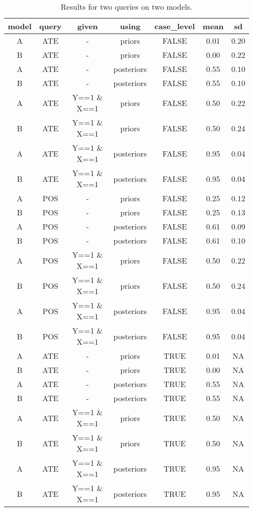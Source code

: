 \documentclass[
  11pt,
  article]{jss}
\begin{document}
\begin{longtable}[t]{ccccccc}

\caption{\label{tbl-batch-query}Results for two queries on two models.}

\tabularnewline

\toprule
model & query & given & using & case\_level & mean & sd\\
\midrule
A & ATE & - & priors & FALSE & 0.01 & 0.20\\
B & ATE & - & priors & FALSE & 0.00 & 0.22\\
A & ATE & - & posteriors & FALSE & 0.55 & 0.10\\
B & ATE & - & posteriors & FALSE & 0.55 & 0.10\\
A & ATE & Y==1 \& X==1 & priors & FALSE & 0.50 & 0.22\\
\addlinespace
B & ATE & Y==1 \& X==1 & priors & FALSE & 0.50 & 0.24\\
A & ATE & Y==1 \& X==1 & posteriors & FALSE & 0.95 & 0.04\\
B & ATE & Y==1 \& X==1 & posteriors & FALSE & 0.95 & 0.04\\
A & POS & - & priors & FALSE & 0.25 & 0.12\\
B & POS & - & priors & FALSE & 0.25 & 0.13\\
\addlinespace
A & POS & - & posteriors & FALSE & 0.61 & 0.09\\
B & POS & - & posteriors & FALSE & 0.61 & 0.10\\
A & POS & Y==1 \& X==1 & priors & FALSE & 0.50 & 0.22\\
B & POS & Y==1 \& X==1 & priors & FALSE & 0.50 & 0.24\\
A & POS & Y==1 \& X==1 & posteriors & FALSE & 0.95 & 0.04\\
\addlinespace
B & POS & Y==1 \& X==1 & posteriors & FALSE & 0.95 & 0.04\\
A & ATE & - & priors & TRUE & 0.01 & NA\\
B & ATE & - & priors & TRUE & 0.00 & NA\\
A & ATE & - & posteriors & TRUE & 0.55 & NA\\
B & ATE & - & posteriors & TRUE & 0.55 & NA\\
\addlinespace
A & ATE & Y==1 \& X==1 & priors & TRUE & 0.50 & NA\\
B & ATE & Y==1 \& X==1 & priors & TRUE & 0.50 & NA\\
A & ATE & Y==1 \& X==1 & posteriors & TRUE & 0.95 & NA\\
B & ATE & Y==1 \& X==1 & posteriors & TRUE & 0.95 & NA\\

\end{longtable}
\end{document}

